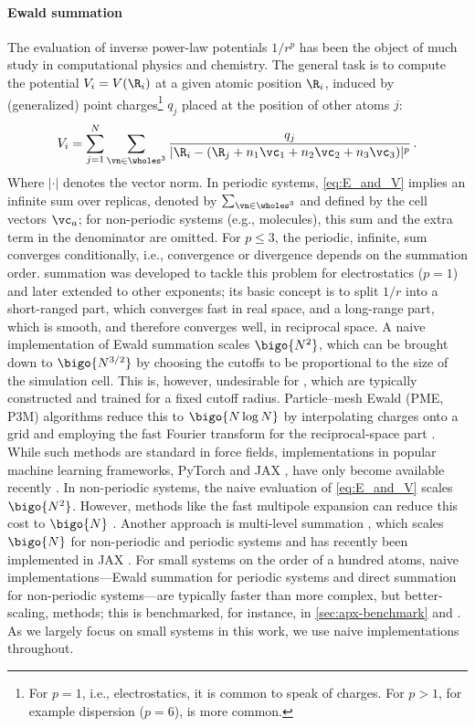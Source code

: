 \documentclass[10pt]{article}
\begin{document}
\paragraph{Ewald summation}
\label{sec:apx-ewald_summation}
The evaluation of inverse power-law potentials $1/r^p$ has been the object of much study in computational physics and chemistry. The general task is to compute the potential $V_i = V(\R_i)$ at a given atomic position $\R_i$, induced by (generalized) point charges\footnote{For $p=1$, i.e., electrostatics, it is common to speak of charges. For $p>1$, for example dispersion ($p=6$),  is more common.} $q_j$ placed at the position of other atoms $j$:
\begin{equation}
    V_i = \sum_{j=1}^N \sum_{\vn \in \wholes^3} \frac{q_j}{|\R_i - (\R_j + n_1 \vc_1 + n_2 \vc_2 + n_3 \vc_3 )|^p}  \,. \label{eq:E_and_V}
\end{equation}
Where $|\cdot|$ denotes the vector norm. In periodic systems, \cref{eq:E_and_V} implies an infinite sum over replicas, denoted by $\sum_{\vn \in \wholes^3}$ and defined by the cell vectors $\vc_a$; for non-periodic systems (e.g., molecules), this sum and the extra term in the denominator are omitted. For $p\leq3$, the periodic, infinite, sum converges conditionally, i.e., convergence or divergence depends on the summation order. \citet{e1921} summation was developed to tackle this problem for electrostatics ($p=1$) and later extended to other exponents; its basic concept is to split $1/r$ into a short-ranged part, which converges fast in real space, and a long-range part, which is smooth, and therefore converges well, in reciprocal space.
A naive implementation of Ewald summation scales $\bigo{N^2}$, which can be brought down to $\bigo{N^{3/2}}$ by choosing the cutoffs to be proportional to the size of the simulation cell. 
This is, however, undesirable for \mlps, which are typically constructed and trained for a fixed cutoff radius.
Particle–mesh Ewald (PME, P3M) algorithms reduce this to $\bigo{N \log N}$ by interpolating charges onto a grid and employing the fast Fourier transform for the reciprocal-space part \citep{dyp1993,he2021}.
While such methods are standard in force fields, implementations in popular machine learning frameworks, PyTorch \citep{pgmlbcklgadkydrtcsfbc2019} and JAX \citep{bfhjlmnpvwz2018}, have only become available recently \citep{lhhxrhlc2025}.
In non-periodic systems, the naive evaluation of \cref{eq:E_and_V} scales $\bigo{N^2}$. However, methods like the fast multipole expansion can reduce this cost to $\bigo{N}$ \citep{gr1987}. 
Another approach is multi-level summation \citep{hwpsss2015}, which scales $\bigo{N}$ for non-periodic and periodic systems and has recently been implemented in JAX \citep{bsucm2025pre}.
For small systems on the order of a hundred atoms, naive implementations---Ewald summation for periodic systems and direct summation for non-periodic systems---are typically faster than more complex, but better-scaling, methods; this is benchmarked, for instance, in \cref{sec:apx-benchmark} and \citet{lhhxrhlc2025}. As we largely focus on small systems in this work, we use naive implementations throughout.
\end{document}
